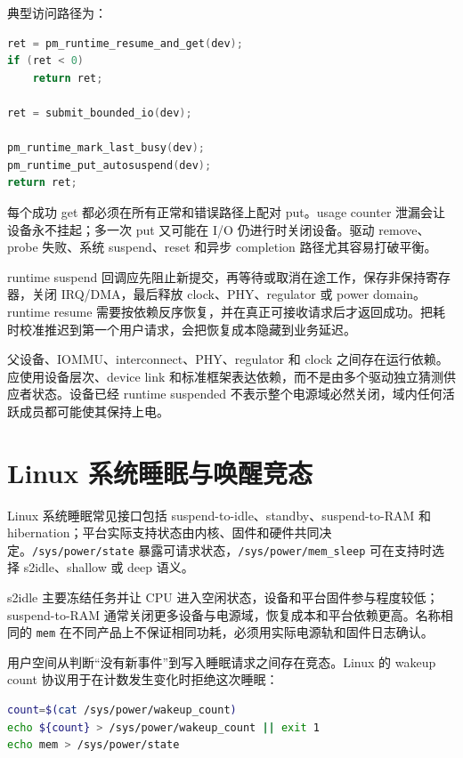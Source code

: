 典型访问路径为：

\begin{lstlisting}[language=C,caption={runtime PM 使用计数的基本配对}]
ret = pm_runtime_resume_and_get(dev);
if (ret < 0)
    return ret;

ret = submit_bounded_io(dev);

pm_runtime_mark_last_busy(dev);
pm_runtime_put_autosuspend(dev);
return ret;
\end{lstlisting}

每个成功 get 都必须在所有正常和错误路径上配对 put。usage counter 泄漏会让设备永不挂起；多一次 put 又可能在 I/O 仍进行时关闭设备。驱动 remove、probe 失败、系统 suspend、reset 和异步 completion 路径尤其容易打破平衡。

runtime suspend 回调应先阻止新提交，再等待或取消在途工作，保存非保持寄存器，关闭 IRQ/DMA，最后释放 clock、PHY、regulator 或 power domain。runtime resume 需要按依赖反序恢复，并在真正可接收请求后才返回成功。把耗时校准推迟到第一个用户请求，会把恢复成本隐藏到业务延迟。

父设备、IOMMU、interconnect、PHY、regulator 和 clock 之间存在运行依赖。应使用设备层次、device link 和标准框架表达依赖，而不是由多个驱动独立猜测供应者状态\cite{linux-device-power-management}。设备已经 runtime suspended 不表示整个电源域必然关闭，域内任何活跃成员都可能使其保持上电。

\section{Linux 系统睡眠与唤醒竞态}

Linux 系统睡眠常见接口包括 suspend-to-idle、standby、suspend-to-RAM 和 hibernation；平台实际支持状态由内核、固件和硬件共同决定\cite{linux-system-sleep}。\texttt{/sys/power/state} 暴露可请求状态，\texttt{/sys/power/mem\_sleep} 可在支持时选择 s2idle、shallow 或 deep 语义。

s2idle 主要冻结任务并让 CPU 进入空闲状态，设备和平台固件参与程度较低；suspend-to-RAM 通常关闭更多设备与电源域，恢复成本和平台依赖更高。名称相同的 \texttt{mem} 在不同产品上不保证相同功耗，必须用实际电源轨和固件日志确认。

用户空间从判断“没有新事件”到写入睡眠请求之间存在竞态。Linux 的 wakeup count 协议用于在计数发生变化时拒绝这次睡眠：

\begin{lstlisting}[language=bash,caption={使用 wakeup count 避免遗漏唤醒事件的示意}]
count=$(cat /sys/power/wakeup_count)
echo ${count} > /sys/power/wakeup_count || exit 1
echo mem > /sys/power/state
\end{lstlisting}

